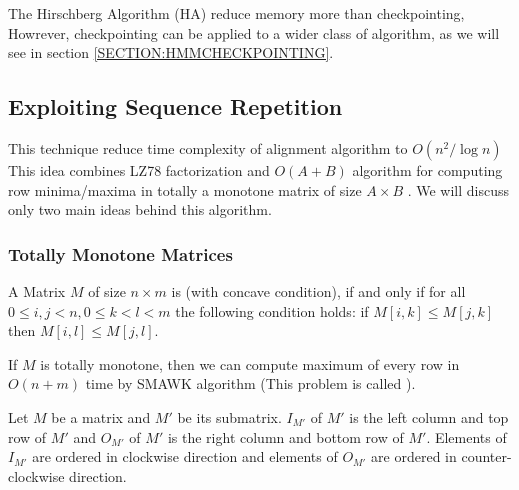 The Hirschberg Algorithm (HA) reduce memory more than checkpointing, 
Howrever, checkpointing can be applied to a wider class of algorithm, as we will
see in section \ref{SECTION:HMMCHECKPOINTING}.



\subsection{Exploiting Sequence Repetition}

This technique reduce time complexity of alignment algorithm to $O(n^2/\log n)$
This idea combines LZ78 factorization \cite{Lempel1976} and
$O(A+B)$ algorithm for computing row minima/maxima in totally a monotone matrix of
size $A\times B$ \cite{Aggarwal1987}. We will discuss only two main ideas behind
this algorithm. 

\subsubsection{Totally Monotone Matrices}

\begin{definition}\cite{Crochemore2002}
A Matrix $M$ of size $n\times m$ is  (with concave condition),
if and only if for all $0\leq i,j< n, 0\leq k<l<m$ the following condition holds:
if $M[i,k]\leq M[j,k]$ then $M[i,l]\leq M[j,l]$.
\end{definition}

If $M$ is totally monotone, then we can compute maximum of every row 
in $O(n+m)$ time by SMAWK algorithm \cite{Aggarwal1987} (This problem is called
).

\begin{definition}\cite{Crochemore2002}
Let $M$ be a matrix and $M'$ be its
submatrix.  $I_{M'}$ of $M'$ is the left column and top
row of $M'$ and  $O_{M'}$ of $M'$ is the right column and
bottom row of $M'$. Elements of $I_{M'}$ are ordered in clockwise direction
and elements of $O_{M'}$ are ordered in counter-clockwise direction.
\end{definition}

